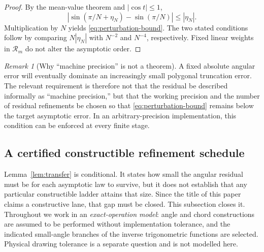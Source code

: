 \documentclass[12pt]{article}
\theoremstyle{definition}
\theoremstyle{remark}
\newtheorem{remark}[theorem]{Remark}
\newcommand{\Rop}{\mathcal{R}}
\newcommand{\abs}[1]{\left|#1\right|}
\begin{document}
\begin{proof}
By the mean-value theorem and $\abs{\cos t}\le1$,
\[
  \abs{\sin(\pi/N+\eta_N)-\sin(\pi/N)}\le\abs{\eta_N}.
\]
Multiplication by $N$ yields \eqref{eq:perturbation-bound}.  The two stated
conditions follow by comparing $N\abs{\eta_N}$ with $N^{-2}$ and $N^{-4}$,
respectively.  Fixed linear weights in $\Rop_m$ do not alter the asymptotic
order.
\end{proof}

\begin{remark}[Why ``machine precision'' is not a theorem]
A fixed absolute angular error will eventually dominate an increasingly small
polygonal truncation error.  The relevant requirement is therefore not that the
residual be described informally as ``machine precision,'' but that the working
precision and the number of residual refinements be chosen so that
\eqref{eq:perturbation-bound} remains below the target asymptotic error.  In an
arbitrary-precision implementation, this condition can be enforced at every
finite stage.
\end{remark}


\subsection{A certified constructible refinement schedule}
\label{subsec:ladder}

Lemma~\ref{lem:transfer} is conditional.  It states how small the angular
residual must be for each asymptotic law to survive, but it does not establish
that any particular constructible ladder attains that size.  Since the title of
this paper claims a constructive lane, that gap must be closed.  This subsection
closes it.  Throughout we work in an \emph{exact-operation model}: angle and
chord constructions are assumed to be performed without implementation
tolerance, and the indicated small-angle branches of the inverse trigonometric
functions are selected.  Physical drawing tolerance is a separate question and
is not modelled here.
\end{document}
